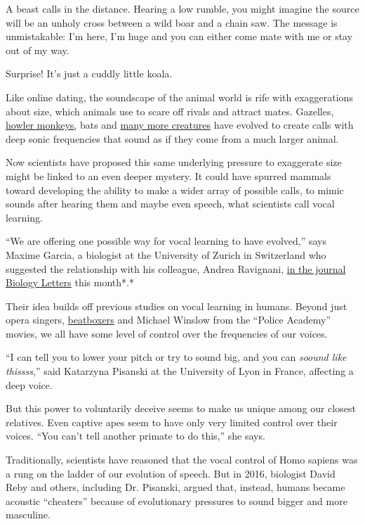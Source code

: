 A beast calls in the distance. Hearing a low rumble, you might imagine
the source will be an unholy cross between a wild boar and a chain saw.
The message is unmistakable: I'm here, I'm huge and you can either come
mate with me or stay out of my way.

Surprise! It's just a cuddly little koala.

Like online dating, the soundscape of the animal world is rife with
exaggerations about size, which animals use to scare off rivals and
attract mates. Gazelles,
\href{https://www.nytimes.com/2015/10/23/science/howler-monkey-species-deep-voice-testicle-size.html}{howler
monkeys,} bats and
\href{https://www.nature.com/articles/ncomms12739}{many more creatures}
have evolved to create calls with deep sonic frequencies that sound as
if they come from a much larger animal.

Now scientists have proposed this same underlying pressure to exaggerate
size might be linked to an even deeper mystery. It could have spurred
mammals toward developing the ability to make a wider array of possible
calls, to mimic sounds after hearing them and maybe even speech, what
scientists call vocal learning.

``We are offering one possible way for vocal learning to have evolved,''
says Maxime Garcia, a biologist at the University of Zurich in
Switzerland who suggested the relationship with his colleague, Andrea
Ravignani,
\href{https://royalsocietypublishing.org/doi/full/10.1098/rsbl.2020.0081?af=R}{in
the journal Biology Letters} this month*.*

Their idea builds off previous studies on vocal learning in humans.
Beyond just opera singers,
\href{https://www.nytimes.com/2018/11/07/science/beatboxing-mri-scanner.html}{beatboxers}
and Michael Winslow from the ``Police Academy'' movies, we all have some
level of control over the frequencies of our voices.

``I can tell you to lower your pitch or try to sound big, and you can
\emph{soound like thissss},'' said Katarzyna Pisanski at the University
of Lyon in France, affecting a deep voice.

But this power to voluntarily deceive seems to make us unique among our
closest relatives. Even captive apes seem to have only very limited
control over their voices. ``You can't tell another primate to do
this,'' she says.

Traditionally, scientists have reasoned that the vocal control of Homo
sapiens was a rung on the ladder of our evolution of speech. But in
2016, biologist David Reby and others, including Dr. Pisanski, argued
that, instead, humans became acoustic ``cheaters'' because of
evolutionary pressures to sound bigger and more masculine.

